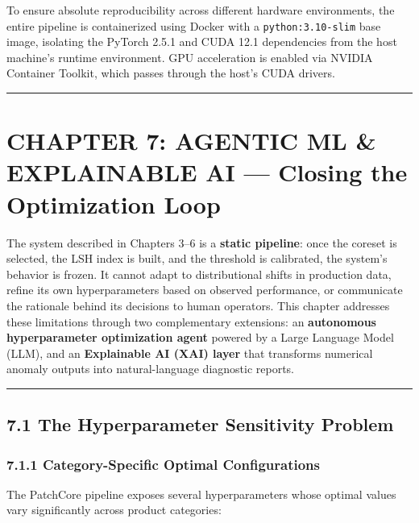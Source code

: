 To ensure absolute reproducibility across different hardware environments, the entire pipeline is containerized using Docker with a \texttt{python:3.10-slim} base image, isolating the PyTorch 2.5.1 and CUDA 12.1 dependencies from the host machine's runtime environment. GPU acceleration is enabled via NVIDIA Container Toolkit, which passes through the host's CUDA drivers.

\begin{center}\rule{0.5\linewidth}{0.5pt}\end{center}

\section{CHAPTER 7: AGENTIC ML \& EXPLAINABLE AI --- Closing the Optimization Loop}\label{chapter-7-agentic-ml-explainable-ai-closing-the-optimization-loop}

The system described in Chapters 3--6 is a \textbf{static pipeline}: once the coreset is selected, the LSH index is built, and the threshold is calibrated, the system's behavior is frozen. It cannot adapt to distributional shifts in production data, refine its own hyperparameters based on observed performance, or communicate the rationale behind its decisions to human operators. This chapter addresses these limitations through two complementary extensions: an \textbf{autonomous hyperparameter optimization agent} powered by a Large Language Model (LLM), and an \textbf{Explainable AI (XAI) layer} that transforms numerical anomaly outputs into natural-language diagnostic reports.

\begin{center}\rule{0.5\linewidth}{0.5pt}\end{center}

\subsection{7.1 The Hyperparameter Sensitivity Problem}\label{the-hyperparameter-sensitivity-problem}

\subsubsection{7.1.1 Category-Specific Optimal Configurations}\label{category-specific-optimal-configurations}

The PatchCore pipeline exposes several hyperparameters whose optimal values vary significantly across product categories:

